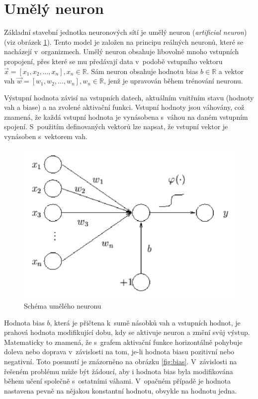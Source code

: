 \section{Umělý neuron}
Základní stavební jednotka neuronových sítí je umělý neuron (\textit{artificial neuron}) (viz obrázek \ref{fig:neuron}). Tento model je založen na principu reálných neuronů, které se nacházejí v~organizmech. Umělý neuron obsahuje libovolně mnoho vstupních propojení, přes které se mu předávají data v~podobě vstupního vektoru $\overrightarrow{x} = [x_1, x_2, \dots, x_n], x_n \in \mathbb{R}$. Sám neuron obsahuje hodnotu bias $b \in \mathbb{R}$ a vektor vah $\overrightarrow{w} = [w_1, w_2, \dots, w_n], w_n \in \mathbb{R}$, jenž je upravován během trénování neuronu.

Výstupní hodnota závisí na vstupních datech, aktuálním vnitřním stavu (hodnoty vah a biase) a na zvolené aktivační funkci. Vstupní hodnoty jsou váhovány, což znamená, že každá vstupní hodnota je vynásobena s~váhou na daném vstupním spojení. S~použitím definovaných vektorů lze napsat, že vstupní vektor je vynásoben s~vektorem vah.

\begin{figure}[H]
    \centering
    \includegraphics[scale=0.35]{obrazky-figures/perceptron.png}
    \caption{\label{fig:neuron}Schéma umělého neuronu}
\end{figure}

Hodnota bias $b$, která je přičtena k~sumě násobků vah a vstupních hodnot, je prahová hodnota modifikující dobu, kdy se aktivuje neuron a změní svůj výstup. Matematicky to znamená, že s~grafem aktivační funkce horizontálně pohybuje doleva nebo doprava v~závislosti na tom, je-li hodnota biasu pozitivní nebo negativní. Toto posunutí je znázorněno na obrázku \ref{fig:bias}. V~závislosti na řešeném problému může být žádoucí, aby i hodnota bias byla modifikována během učení společně s~ostatními váhami. V~opačném případě je hodnota nastavena pevně na nějakou konstantní hodnotu, obvykle na hodnotu jedna.

